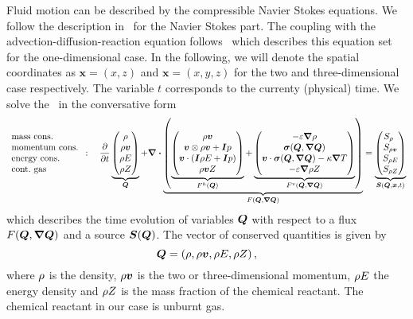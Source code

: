 Fluid motion can be described by the compressible Navier Stokes equations.
We follow the description in~\cite{dumbser2010arbitrary} for the Navier Stokes part.
The coupling with the advection-diffusion-reaction equation follows~\cite{hidalgo2011ader} which describes this equation set for the one-dimensional case.
In the following, we will denote the spatial coordinates as $\bm{x} = \left( x,z \right)$ and $\bm{x} = \left( x,y,z \right)$ for the two and three-dimensional case respectively.
The variable $t$ corresponds to the currenty (physical) time.
We solve the \pde\ in the conversative form 
\begin{equation}
 \label{eq:equation-set} 
 \begin{array}{l}
 \text{mass cons.} \\
 \text{momentum cons.} \\
 \text{energy cons.} \\
 \text{cont.\ gas} 
\end{array}
:
\quad
  \pdv{}{t}
  \underbrace{
  \begin{pmatrix}
    \Qrho\\
    \Qj\\
    \QE\\
    \QZ
    \end{pmatrix}}_{\Q}
  +
  \divergence{
  \underbrace{
  \left(
   \underbrace{\hyperFluxDef}_{\hyperFlux(\Q)}
+
\underbrace{\viscFluxDef}_{\viscFlux(\Q, \gradQ)}
  \right)}_{\flux(\Q, \gradQ)}}
 =
  \underbrace{
  \begin{pmatrix}
    \source[\Qrho\phantom{\Qrho}]\\
    \source[\Qj]\\
    \source[\QE]\\
    \source[\QZ]
    \end{pmatrix}}_{\source(\Q, \bm{x}, t)}
\end{equation}
which describes the time evolution of variables $\bm{Q}$ with respect to a flux $\flux(\Q, \gradQ)$ and a source $\source(\Q)$.
The vector of conserved quantities is given by
\begin{equation}
  \label{eq:conserved-variables}
 \bm{Q} = \left( \rho, \rho \bm{v}, \rho E, \rho Z \right),
\end{equation}
where $\rho$ is the density, $\rho \bm{v}$ is the two or three-dimensional momentum, $\rho E$ the energy density and $\rho Z$ is the mass fraction of the chemical reactant.
The chemical reactant in our case is unburnt gas.

